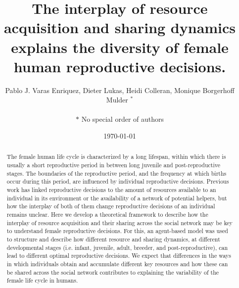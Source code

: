 \documentclass{article}
\title{The interplay of resource acquisition and sharing dynamics explains the diversity of female human reproductive decisions.}
\author{Pablo J. Varas Enriquez, Dieter Lukas, Heidi Colleran, Monique Borgerhoff Mulder $^*$\\\\
$*$ No special order of authors}
\date{\today}
\begin{document}
\maketitle

\begin{abstract}
    The female human life cycle is characterized by a long lifespan, within which there is usually a short reproductive period in between long juvenile and post-reproductive stages. The boundaries of the reproductive period, and the frequency at which births occur during this period, are influenced by individual reproductive decisions. Previous work has linked reproductive decisions to the amount of resources available to an individual in its environment or the availability of a network of potential helpers, but how the interplay of both of them change reproductive decisions of an individual remains unclear. Here we develop a theoretical framework to describe how the interplay of resource acquisition and their sharing across the social network may be key to understand female reproductive decisions. For this, an agent-based model was used to structure and describe how different resource and sharing dynamics, at different developmental stages (i.e. infant, juvenile, adult, breeder, and post-reproductive), can lead to different optimal reproductive decisions. We expect that differences in the ways in which individuals obtain and accumulate different key resources and how these can be shared across the social network contributes to explaining the variability of the female life cycle in humans.
\end{abstract}
\end{document}

